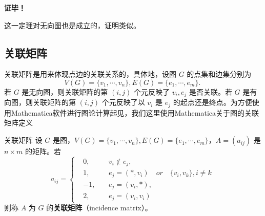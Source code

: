\textbf{证毕！}

这一定理对无向图也是成立的，证明类似。
\subsection{关联矩阵}

关联矩阵是用来体现点边的关联关系的，具体地，设图 $G$ 的点集和边集分别为 
\begin{equation}\label{eq_RepGra_1}
V(G)=\{v_1,\cdots,v_n\},E(G)=\{e_1,\cdots,e_m\}.~
\end{equation}
若 $G$ 是无向图，则关联矩阵的第 $(i,j)$ 个元反映了 $v_i,e_j$ 是否关联。若 $G$ 是有向图，则关联矩阵的第 $(i,j)$ 个元反映了以 $v_i$ 是 $e_j$ 的起点还是终点。为方便使用Mathematica软件进行图论计算起见，我们这里使用Mathematica关于图的关联矩阵定义
\begin{definition}{关联矩阵}\label{def_RepGra_2}
设 $G$ 是图，$V(G)=\{v_1,\cdots,v_n\},E(G)=\{e_1,\cdots,e_m\}$，$A=(a_{ij})$ 是 $n\times m$ 的矩阵。若
\begin{equation}
a_{ij}=\left\{\begin{aligned}
&0,\quad &&v_i\notin e_j,\\
&1, &&e_j=(*,v_i) \quad or\quad \{v_i,v_k\},i\neq k\\
&-1, &&e_j=(v_i,*) ,\\
&2, &&e_j=(v_i,v_i)
\end{aligned}\right.~
\end{equation}
则称 $A$ 为 $G$ 的\textbf{关联矩阵}（incidence matrix）。
\end{definition}
